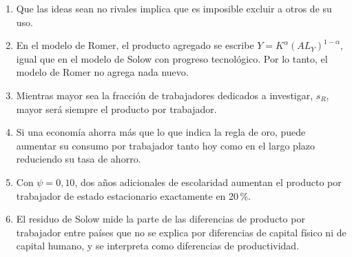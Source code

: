 \documentclass[12pt,letterpaper]{article}
\newif\ifpauta
\newcommand{\ficha}[1]{\ifpauta\par{\small$\Rightarrow$\ #1}\fi}
\begin{document}
\begin{enumerate}[label=F\arabic*.,leftmargin=2.2em,itemsep=0.4em]
\item Que las ideas sean no rivales implica que es imposible excluir a otros de su uso.
\ficha{\textbf{F} · base 16: no rival $\neq$ no excluible. Las patentes hacen las ideas parcialmente excluibles, y eso permite $p>CMg$.}
\item En el modelo de Romer, el producto agregado se escribe $Y=K^{\alpha}(AL_Y)^{1-\alpha}$, igual que en el modelo de Solow con progreso tecnológico. Por lo tanto, el modelo de Romer no agrega nada nuevo.
\ficha{\textbf{F} · base 17: misma forma reducida, pero $A$ es endógena ($\dot A=\theta L_A^{\lambda}A^{\phi}$), con $s_R$ y monopolio.}
\item Mientras mayor sea la fracción de trabajadores dedicados a investigar, $s_R$, mayor será siempre el producto por trabajador.
\ficha{\textbf{F} · base 18: $y\propto s_R(1-s_R)$, que tiene el máximo en $s_R=0{,}5$.}
\item Si una economía ahorra más que lo que indica la regla de oro, puede aumentar su consumo por trabajador tanto hoy como en el largo plazo reduciendo su tasa de ahorro.
\ficha{\textbf{V} · base 19: $f^\prime(k^*)<n+\delta$ (ineficiencia dinámica); bajar $s$ sube $c$ hoy y en el largo plazo.}
\item Con $\psi=0{,}10$, dos años adicionales de escolaridad aumentan el producto por trabajador de estado estacionario exactamente en 20\,\%.
\ficha{\textbf{F} · base 20: $e^{0{,}2}=1{,}221$, o sea $+22{,}1\%$; el 20\% es la aproximación logarítmica.}
\item El residuo de Solow mide la parte de las diferencias de producto por trabajador entre países que no se explica por diferencias de capital físico ni de capital humano, y se interpreta como diferencias de productividad.
\ficha{\textbf{V} (con matiz) · base 20: es lo que no explican $K$ ni $H$; «una medida de nuestra ignorancia».}
\end{enumerate}
\end{document}
